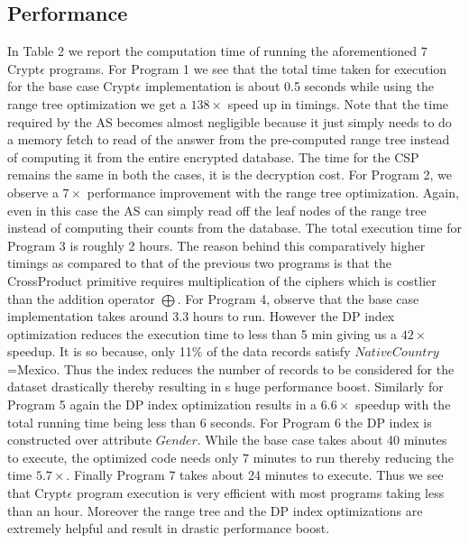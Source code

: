 \subsection{Performance}
In Table 2 we report the computation time of running the aforementioned $7$ Crypt$\epsilon$ programs. For Program 1 we see that the total time taken for execution for the base case Crypt$\epsilon$ implementation is about 0.5 seconds while using the range tree optimization we get a $138\times$ speed up in timings. Note that the time required by the \textsf{AS} becomes almost negligible because it just simply needs to do a memory fetch to read of the answer from the pre-computed range tree instead of computing it from the entire encrypted database. The time for the \textsf{CSP} remains the same in both the cases, it is the decryption cost. For Program 2, we observe a $7\times$ performance improvement with the range tree optimization. Again, even in this case the \textsf{AS} can simply read off the leaf nodes of the range tree instead of computing their counts from the database. The total execution time for Program 3 is roughly 2 hours.  The reason behind this comparatively higher timings as compared to that of the previous two programs is that the \textsf{CrossProduct} primitive requires  multiplication of the ciphers  which is costlier than the addition operator $\bigoplus$. For Program 4, observe that the base case implementation takes around 3.3 hours to run. However the DP index optimization reduces the execution time to less than 5 min giving us a $42\times $ speedup. It is so because, only 11\% of the data records satisfy $NativeCountry$=Mexico. Thus the index reduces the number of records to be considered for the dataset drastically thereby resulting in s huge performance boost. Similarly for Program 5 again the DP index optimization results in a $6.6\times$ speedup with the total running time being less than 6 seconds. For Program 6 the DP index is constructed over attribute $Gender$. While the base case takes about 40 minutes to execute, the optimized code needs only 7 minutes to run thereby reducing the time  $5.7\times$. Finally Program 7 takes about 24 minutes to execute. Thus we see that Crypt$\epsilon$ program execution is very efficient with most programs taking less than an hour. Moreover the range tree and the DP index optimizations are extremely helpful and result in drastic performance boost.
